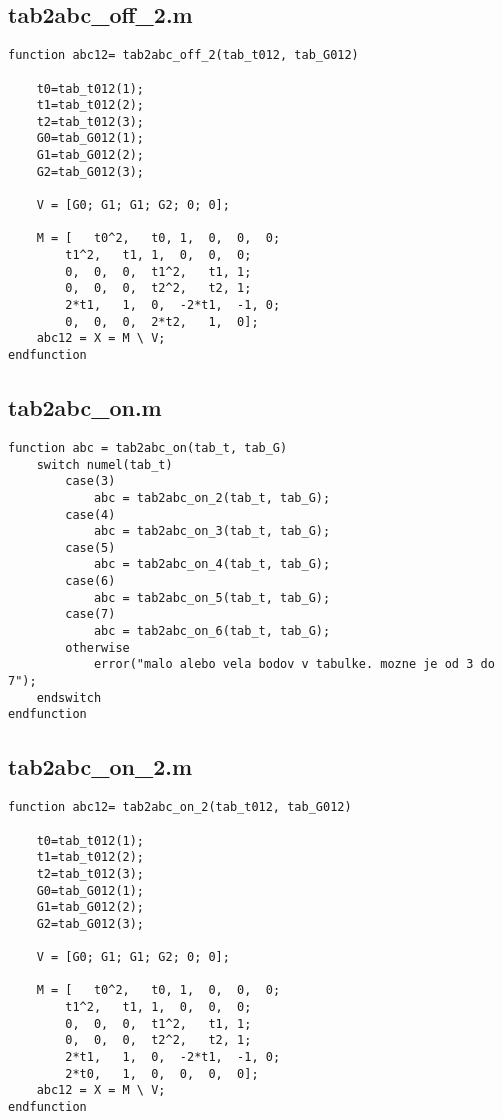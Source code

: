 \subsection*{tab2abc\_off\_2.m}
\begin{lstlisting}
function abc12= tab2abc_off_2(tab_t012, tab_G012)

	t0=tab_t012(1);
	t1=tab_t012(2);
	t2=tab_t012(3);
	G0=tab_G012(1);
	G1=tab_G012(2);
	G2=tab_G012(3);

	V = [G0; G1; G1; G2; 0; 0];

	M = [	t0^2,	t0,	1,	0,	0,	0;
		t1^2,	t1,	1,	0,	0,	0;
		0,	0,	0,	t1^2,	t1,	1;
		0,	0,	0,	t2^2,	t2,	1;
		2*t1,	1,	0,	-2*t1,	-1,	0;
		0,	0,	0,	2*t2,	1,	0];
	abc12 = X = M \ V;
endfunction
\end{lstlisting}

\subsection*{tab2abc\_on.m}
\begin{lstlisting}
function abc = tab2abc_on(tab_t, tab_G)
	switch numel(tab_t)
		case(3)
			abc = tab2abc_on_2(tab_t, tab_G);
		case(4)
			abc = tab2abc_on_3(tab_t, tab_G);
		case(5)
			abc = tab2abc_on_4(tab_t, tab_G);
		case(6)
			abc = tab2abc_on_5(tab_t, tab_G);
		case(7)
			abc = tab2abc_on_6(tab_t, tab_G);
		otherwise
			error("malo alebo vela bodov v tabulke. mozne je od 3 do 7");
	endswitch
endfunction
\end{lstlisting}

\subsection*{tab2abc\_on\_2.m}
\begin{lstlisting}
function abc12= tab2abc_on_2(tab_t012, tab_G012)

	t0=tab_t012(1);
	t1=tab_t012(2);
	t2=tab_t012(3);
	G0=tab_G012(1);
	G1=tab_G012(2);
	G2=tab_G012(3);

	V = [G0; G1; G1; G2; 0; 0];

	M = [	t0^2,	t0,	1,	0,	0,	0;
		t1^2,	t1,	1,	0,	0,	0;
		0,	0,	0,	t1^2,	t1,	1;
		0,	0,	0,	t2^2,	t2,	1;
		2*t1,	1,	0,	-2*t1,	-1,	0;
		2*t0,	1,	0,	0,	0,	0];
	abc12 = X = M \ V;
endfunction
\end{lstlisting}


